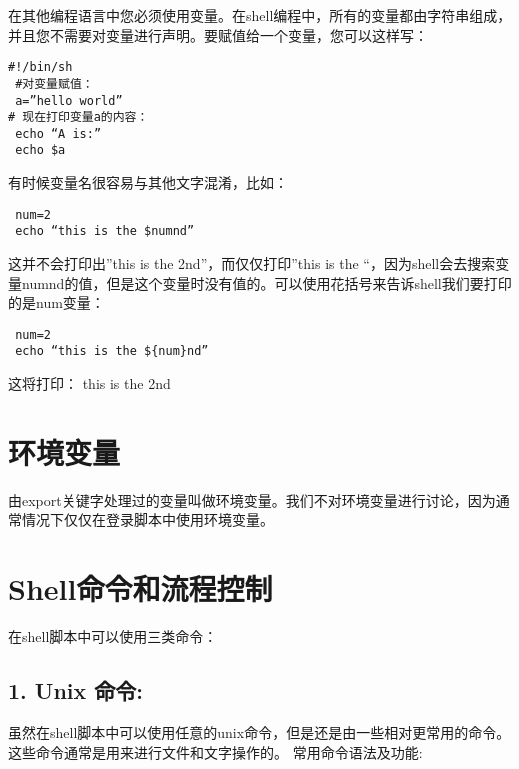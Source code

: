 \documentclass[]{book}
\begin{document}
在其他编程语言中您必须使用变量。在shell编程中，所有的变量都由字符串组成，并且您不需要对变量进行声明。要赋值给一个变量，您可以这样写：

\begin{verbatim}
#!/bin/sh
 #对变量赋值：
 a=”hello world”
# 现在打印变量a的内容：
 echo “A is:”
 echo $a
\end{verbatim}

有时候变量名很容易与其他文字混淆，比如：

\begin{verbatim}
 num=2
 echo “this is the $numnd”
\end{verbatim}

这并不会打印出''this is the 2nd''，而仅仅打印''this is the ``，因为shell会去搜索变量numnd的值，但是这个变量时没有值的。可以使用花括号来告诉shell我们要打印的是num变量：

\begin{verbatim}
 num=2
 echo “this is the ${num}nd”
\end{verbatim}

这将打印： this is the 2nd

\hypertarget{ux73afux5883ux53d8ux91cf}{%
\section{环境变量}\label{ux73afux5883ux53d8ux91cf}}

由export关键字处理过的变量叫做环境变量。我们不对环境变量进行讨论，因为通常情况下仅仅在登录脚本中使用环境变量。

\hypertarget{shellux547dux4ee4ux548cux6d41ux7a0bux63a7ux5236}{%
\section{Shell命令和流程控制}\label{shellux547dux4ee4ux548cux6d41ux7a0bux63a7ux5236}}

在shell脚本中可以使用三类命令：

\hypertarget{unix-ux547dux4ee4}{%
\subsection{1. Unix 命令:}\label{unix-ux547dux4ee4}}

虽然在shell脚本中可以使用任意的unix命令，但是还是由一些相对更常用的命令。这些命令通常是用来进行文件和文字操作的。
常用命令语法及功能:
\end{document}
